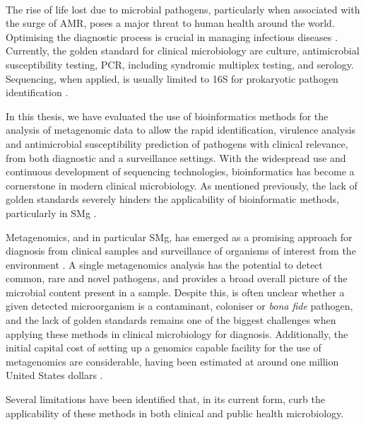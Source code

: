 \mbox{}\\
\vspace{8cm}

The rise of life lost due to microbial pathogens, particularly when associated with the surge of \ac{AMR}, poses a major threat to human health around the world. Optimising the diagnostic process is crucial in managing infectious diseases \citep{vos_global_2020}. Currently, the golden standard for clinical microbiology are culture, antimicrobial susceptibility testing, \ac{PCR}, including syndromic multiplex testing, and serology. Sequencing, when applied, is usually limited to 16S for prokaryotic pathogen identification \citep{greninger_challenge_2018}. 

In this thesis, we have evaluated the use of bioinformatics methods for the analysis of metagenomic data to allow the rapid identification, virulence analysis and antimicrobial susceptibility prediction of pathogens with clinical relevance, from both diagnostic and a surveillance settings. With the widespread use and continuous development of sequencing technologies, bioinformatics has become a cornerstone in modern clinical microbiology. As mentioned previously, the lack of golden standards severely hinders the applicability of bioinformatic methods, particularly in \ac{SMg} \citep{carrico_primer_2018, couto_critical_2018, angers-loustau_challenges_2018, gruening_recommendations_2019, sczyrba_critical_2017}. 

Metagenomics, and in particular \ac{SMg}, has emerged as a promising approach for diagnosis from clinical samples and surveillance of organisms of interest from the environment \citep{loman_culture-independent_2013, rossen__2018, schuele_future_2021, chiu_clinical_2019}. A single metagenomics analysis has the potential to detect common, rare and novel pathogens, and provides a broad overall picture of the microbial content present in a sample. Despite this, is often unclear whether a given detected microorganism is a contaminant, coloniser or \textit{bona fide} pathogen, and the lack of golden standards remains one of the biggest challenges when applying these methods in clinical microbiology for diagnosis. Additionally, the initial capital cost of setting up a genomics capable facility for the use of metagenomics are considerable, having been estimated at around one million United States dollars \citep{greninger_challenge_2018}.

Several limitations have been identified that, in its current form, curb the applicability of these methods in both clinical and public health microbiology. 

